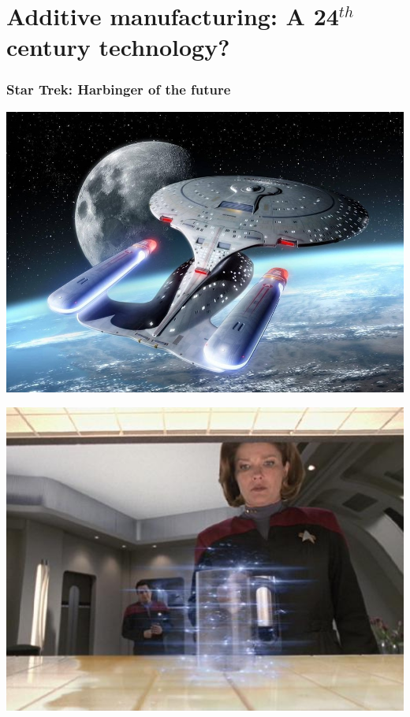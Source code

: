 \documentclass[10pt, compress]{beamer}
\begin{document}
\section{Additive manufacturing: A 24$^{th}$ century technology?}
\begin{frame}[fragile]
\frametitle{Star Trek: Harbinger of the future}\vspace{-1cm}
\begin{center}\includegraphics[scale=0.43]{enterprise.png}\end{center}

\end{frame}

\begin{frame}[fragile]
\begin{center}\includegraphics[scale=0.75]{Coffee_replicates_then_mug.jpg}\end{center}
\end{frame}
\end{document}
